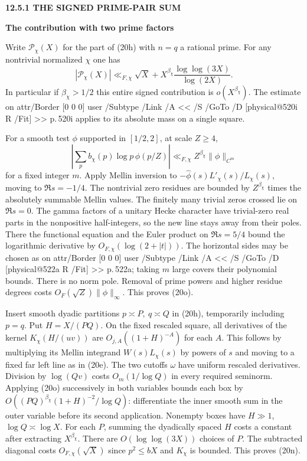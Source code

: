\documentclass[11pt,letterpaper]{article}
\makeatletter
\newcommand{\rightmarktext}{}
\newcommand{\printfolio}{}
\newcommand{\leaf}[4]{\clearpage\gdef\printfolio{#1}\gdef\rightmarktext{#2}%
  {\small\sffamily\bfseries\color{ink}#3\par}\vspace{3pt}%
  {\LARGE\bfseries #4\par}\vspace{5pt}}
\newcommand{\MusicPDFPageRef}[1]{\pdfpageref\csname physical@#1\endcsname\space\space 0 R}
\newcommand{\pagelink}[2]{\leavevmode\pdfstartlink attr{/Border [0 0 0]} user{%
  /Subtype /Link /A << /S /GoTo /D [\MusicPDFPageRef{#1} /Fit] >>}%
  {\color{ink}#2}\pdfendlink}
\newcommand{\pg}[1]{\pagelink{#1}{p.\,#1}}
\makeatother
\begin{document}
\leaf{520j}{Cancellation between primes}{12.5.1 \quad THE SIGNED PRIME-PAIR SUM}{The contribution with two prime factors}
Write $\mathcal P_\chi(X)$ for the part of (20h) with $n=q$ a rational
prime. For any nontrivial normalized $\chi$ one has
\[
    |\mathcal P_\chi(X)|\ll_{F,\chi}
       \sqrt X+X^{\beta_\chi}\frac{\log\log(3X)}{\log(2X)} .
 \tag{20n}
\]
In particular if $\beta_\chi>1/2$ this entire signed contribution is
$o(X^{\beta_\chi})$. The estimate on \pg{520i} applies to its absolute
mass on a single square.

For a smooth test $\phi$ supported in $[1/2,2]$, at scale $Z\ge4$,
\[
   \left|\sum_p b_\chi(p)\log p\,\phi(p/Z)\right|
                \ll_{F,\chi} Z^{\beta_\chi}\|\phi\|_{C^m}
 \tag{20o}
\]
for a fixed integer $m$. Apply Mellin inversion to
$-\widehat\phi(s)L'_\chi(s)/L_\chi(s)$, moving to $\Re s=-1/4$.
The nontrivial zero residues are bounded by $Z^{\beta_\chi}$
times the absolutely summable Mellin values. The finitely many trivial
zeros crossed lie on $\Re s=0$. The gamma factors of a unitary Hecke
character have trivial-zero real parts in the nonpositive half-integers,
so the new line stays away from their poles. There the functional
equation and the Euler product on $\Re s=5/4$ bound the logarithmic
derivative by $O_{F,\chi}(\log(2+|t|))$. The horizontal sides may be
chosen as on \pg{522a}; taking $m$ large covers their polynomial bounds.
There is no norm pole. Removal of prime powers and higher residue
degrees costs $O_F(\sqrt Z)\|\phi\|_\infty$. This proves (20o).

Insert smooth dyadic partitions $p\asymp P,\ q\asymp Q$ in (20h),
temporarily including $p=q$. Put $H=X/(PQ)$. On the fixed rescaled
square, all derivatives of the kernel $K_\chi(H/(uv))$ are
$O_{j,A}((1+H)^{-A})$ for each $A$. This follows by multiplying its
Mellin integrand $W(s)L_\chi(s)$ by powers of $s$ and moving to a
fixed far left line as in (20e). The two cutoffs $\omega$ have uniform
rescaled derivatives. Division by $\log(Qv)$ costs $O_m(1/\log Q)$
in every required seminorm. Applying (20o) successively in both
variables bounds each box by
$O((PQ)^{\beta_\chi}(1+H)^{-2}/\log Q)$: differentiate the inner
smooth sum in the outer variable before its second application.
Nonempty boxes have $H\gg1$, $\log Q\asymp\log X$. For each $P$,
summing the dyadically spaced $H$ costs a constant after extracting
$X^{\beta_\chi}$. There are $O(\log\log(3X))$ choices of $P$.
The subtracted diagonal costs $O_{F,\chi}(\sqrt X)$ since $p^2\le bX$ and
$K_\chi$ is bounded. This proves (20n).
\end{document}
